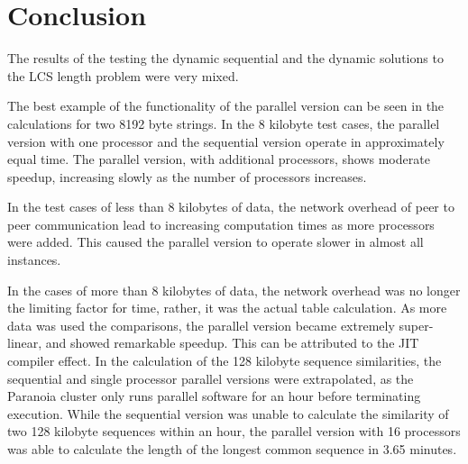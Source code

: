 \section{Conclusion}
The results of the testing the dynamic sequential and the dynamic
solutions to the LCS length problem were very mixed.

The best example of the functionality of the parallel version can be
seen in the calculations for two 8192 byte strings. In the 8 kilobyte
test cases, the parallel version with one processor and the sequential
version operate in approximately equal time. The parallel version,
with additional processors, shows moderate speedup, increasing slowly
as the number of processors increases.

In the test cases of less than 8 kilobytes of data, the network
overhead of peer to peer communication lead to increasing computation
times as more processors were added. This caused the parallel version
to operate slower in almost all instances.

In the cases of more than 8 kilobytes of data, the network overhead
was no longer the limiting factor for time, rather, it was the actual
table calculation. As more data was used the comparisons, the
parallel version became extremely super-linear, and showed remarkable
speedup. This can be attributed to the JIT compiler effect. In the
calculation of the 128 kilobyte sequence similarities, the sequential
and single processor parallel versions were extrapolated, as the
Paranoia cluster only runs parallel software for an hour before
terminating execution. While the sequential version was unable to
calculate the similarity of two 128 kilobyte sequences within an hour,
the parallel version with 16 processors was able to calculate the
length of the longest common sequence in 3.65 minutes.
